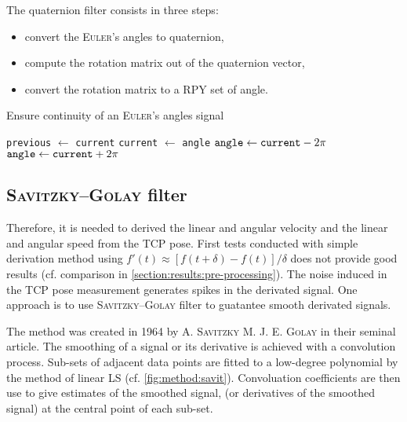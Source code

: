 \documentclass[/home/francois/latex/report/main.tex]{subfiles}
\begin{document}
The quaternion filter consists in three steps:

\begin{itemize}
  \item convert the \textsc{Euler}'s angles to quaternion,
  \item compute the rotation matrix out of the quaternion vector,
  \item convert the rotation matrix to a \ac{RPY} set of angle.
\end{itemize}

\begin{algorithm}
\caption{Ensure continuity of an \textsc{Euler}'s angles signal \label{alg:method:continuity}}
\begin{algorithmic}
  \STATE \texttt{previous}  $\leftarrow$ \texttt{current}
  \STATE \texttt{current}  $\leftarrow$ \texttt{angle}
    \STATE $\text{\texttt{angle}} \leftarrow \text{\texttt{current}} - 2 \pi$
   \ELSE
    \STATE $\text{\texttt{angle}} \leftarrow \text{\texttt{current}} + 2 \pi$
   \ENDIF
  \ENDIF
 \ENDFOR
\ENDFOR
\end{algorithmic}
\end{algorithm}

\subsection{\textsc{Savitzky–Golay} filter}

Therefore, it is needed to derived the linear and angular velocity and the linear and angular speed from the \ac{TCP} pose. First tests conducted with simple derivation method using $f'(t) \approx  [f(t+\delta) - f(t)] / \delta$ does not provide good results (cf. comparison in \ref{section:results:pre-processing}). The noise induced in the \ac{TCP} pose measurement generates spikes in the derivated signal. One approach is to use \textsc{Savitzky–Golay} filter to guatantee smooth derivated signals.

The method was created in 1964 by A. \textsc{Savitzky} M. J. E. \textsc{Golay} \cite{Savitzky1964} in their seminal article. The smoothing of a signal or its derivative is achieved with a convolution process. Sub-sets of adjacent data points are fitted to a low-degree polynomial by the method of linear \ac{LS} (cf. \ref{fig:method:savit}). Convoluation coefficients are then use to give estimates of the smoothed signal, (or derivatives of the smoothed signal) at the central point of each sub-set.
\end{document}

